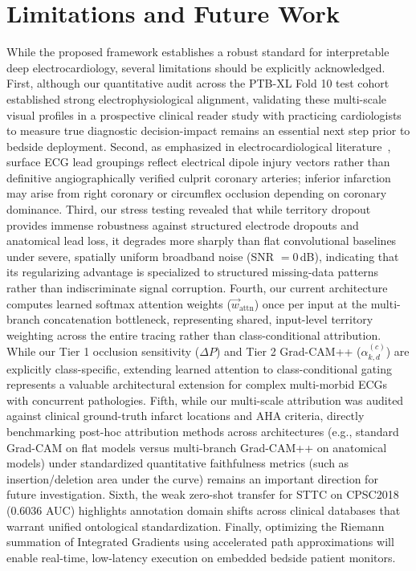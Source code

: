 \documentclass[12pt]{elsarticle}
\begin{document}
\section{Limitations and Future Work}
\label{sec:limitations}
While the proposed framework establishes a robust standard for interpretable deep electrocardiology, several limitations should be explicitly acknowledged. First, although our quantitative audit across the PTB-XL Fold 10 test cohort established strong electrophysiological alignment, validating these multi-scale visual profiles in a prospective clinical reader study with practicing cardiologists to measure true diagnostic decision-impact remains an essential next step prior to bedside deployment. Second, as emphasized in electrocardiological literature~\cite{wagner2009aha}, surface ECG lead groupings reflect electrical dipole injury vectors rather than definitive angiographically verified culprit coronary arteries; inferior infarction may arise from right coronary or circumflex occlusion depending on coronary dominance. Third, our stress testing revealed that while territory dropout provides immense robustness against structured electrode dropouts and anatomical lead loss, it degrades more sharply than flat convolutional baselines under severe, spatially uniform broadband noise (SNR $= 0$\,dB), indicating that its regularizing advantage is specialized to structured missing-data patterns rather than indiscriminate signal corruption. Fourth, our current architecture computes learned softmax attention weights ($\vec{w}_{\text{attn}}$) once per input at the multi-branch concatenation bottleneck, representing shared, input-level territory weighting across the entire tracing rather than class-conditional attribution. While our Tier 1 occlusion sensitivity ($\Delta P$) and Tier 2 Grad-CAM++ ($\alpha_{k, d}^{(c)}$) are explicitly class-specific, extending learned attention to class-conditional gating represents a valuable architectural extension for complex multi-morbid ECGs with concurrent pathologies. Fifth, while our multi-scale attribution was audited against clinical ground-truth infarct locations and AHA criteria, directly benchmarking post-hoc attribution methods across architectures (e.g., standard Grad-CAM on flat models versus multi-branch Grad-CAM++ on anatomical models) under standardized quantitative faithfulness metrics (such as insertion/deletion area under the curve) remains an important direction for future investigation. Sixth, the weak zero-shot transfer for STTC on CPSC2018 (0.6036 AUC) highlights annotation domain shifts across clinical databases that warrant unified ontological standardization. Finally, optimizing the Riemann summation of Integrated Gradients using accelerated path approximations will enable real-time, low-latency execution on embedded bedside patient monitors.
\end{document}

